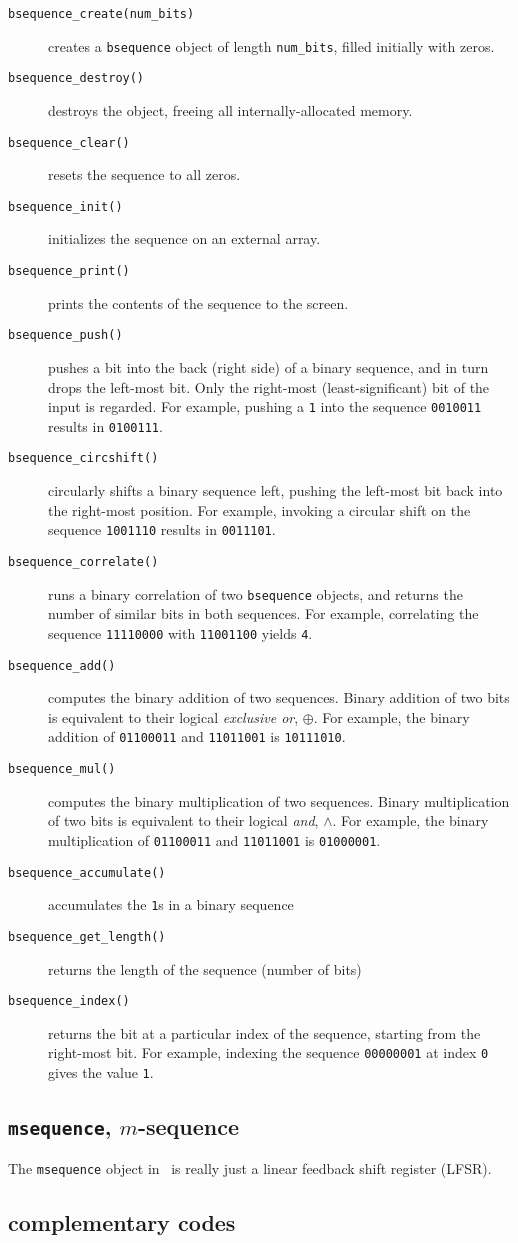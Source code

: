\begin{description}
\item[{\tt bsequence\_create(num\_bits)}]
    creates a {\tt bsequence} object of length {\tt num\_bits}, filled
    initially with zeros.
\item[{\tt bsequence\_destroy()}]
    destroys the object, freeing all internally-allocated memory.
\item[{\tt bsequence\_clear()}]
    resets the sequence to all zeros.
\item[{\tt bsequence\_init()}]
    initializes the sequence on an external array.
\item[{\tt bsequence\_print()}]
    prints the contents of the sequence to the screen.
\item[{\tt bsequence\_push()}]
    pushes a bit into the back (right side) of a binary sequence, and in turn
    drops the left-most bit.
    Only the right-most (least-significant) bit of the input is regarded.
    For example, pushing a {\tt 1} into the sequence {\tt 0010011} results in
    {\tt 0100111}.
\item[{\tt bsequence\_circshift()}]
    circularly shifts a binary sequence left, pushing the left-most bit back
    into the right-most position.
    For example, invoking a circular shift on the sequence {\tt 1001110}
    results in {\tt 0011101}.
\item[{\tt bsequence\_correlate()}]
    runs a binary correlation of two {\tt bsequence} objects, and returns the
    number of similar bits in both sequences.
    For example, correlating the sequence {\tt 11110000} with {\tt 11001100}
    yields {\tt 4}.
\item[{\tt bsequence\_add()}]
    computes the binary addition of two sequences.
    Binary addition of two bits is equivalent to their logical
    {\em exclusive or}, $\oplus$.
    For example, the binary addition of
    {\tt 01100011} and
    {\tt 11011001} is
    {\tt 10111010}.
\item[{\tt bsequence\_mul()}]
    computes the binary multiplication of two sequences.
    Binary multiplication of two bits is equivalent to their logical
    {\em and}, $\land$.
    For example, the binary multiplication of
    {\tt 01100011} and
    {\tt 11011001} is
    {\tt 01000001}.
\item[{\tt bsequence\_accumulate()}]
    accumulates the {\tt 1}s in a binary sequence
\item[{\tt bsequence\_get\_length()}]
    returns the length of the sequence (number of bits)
\item[{\tt bsequence\_index()}]
    returns the bit at a particular index of the sequence, starting from the
    right-most bit.
    For example, indexing the sequence {\tt 00000001} at index {\tt 0} gives
    the value {\tt 1}.
\end{description}


\subsection{{\tt msequence}, $m$-sequence}
\label{module:sequence:msequence}
The {\tt msequence} object in \liquid\ is really just a linear feedback shift
register (LFSR).


\subsection{complementary codes}
\label{module:sequence:ccodes}


